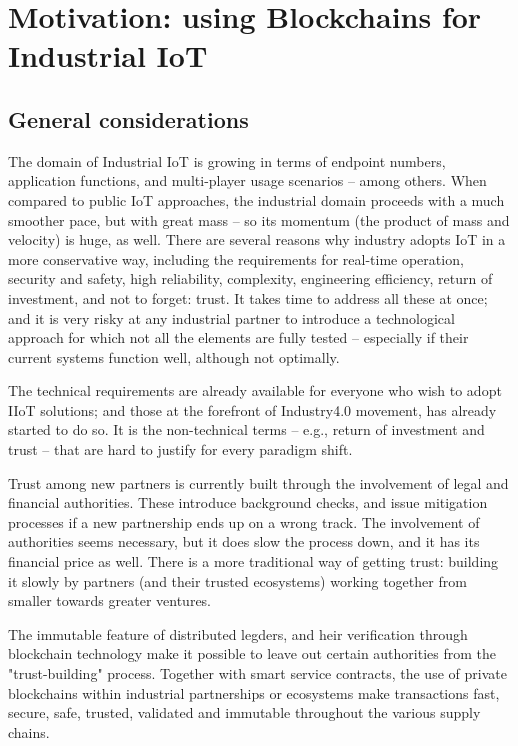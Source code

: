 \documentclass[a4paper]{article}
\begin{document}
\section{Motivation: using Blockchains for Industrial IoT}

\subsection{General considerations}

The domain of Industrial IoT is growing in terms of endpoint numbers, application functions, and multi-player usage scenarios -- among others. When compared to public IoT approaches, the industrial domain proceeds with a much smoother pace, but with great mass -- so its momentum (the product of mass and velocity) is huge, as well. There are several reasons why industry adopts IoT in a more conservative way, including the requirements for real-time operation, security and safety, high reliability, complexity, engineering efficiency, return of investment, and not to forget: trust. It takes time to address all these at once; and it is very risky at any industrial partner to introduce a technological approach for which not all the elements are fully tested -- especially if their current systems function well, although not optimally.

The technical requirements are already available for everyone who wish to adopt IIoT solutions; and those at the forefront of Industry4.0 movement, has already started to do so. It is the non-technical terms -- e.g., return of investment and trust -- that are hard to justify for every paradigm shift.

Trust among new partners is currently built through the involvement of legal and financial authorities. These introduce background checks, and issue mitigation processes if a new partnership ends up on a wrong track. The involvement of authorities seems necessary, but it does slow the process down, and it has its financial price as well. There is a more traditional way of getting trust: building it slowly by partners (and their trusted ecosystems) working together from smaller towards greater ventures.

The immutable feature of distributed legders, and heir verification through blockchain technology make it possible to leave out certain authorities from the "trust-building" process. Together with smart service contracts, the use of private blockchains within industrial partnerships or ecosystems make transactions fast, secure, safe, trusted, validated and immutable throughout the various supply chains. 
\end{document}

